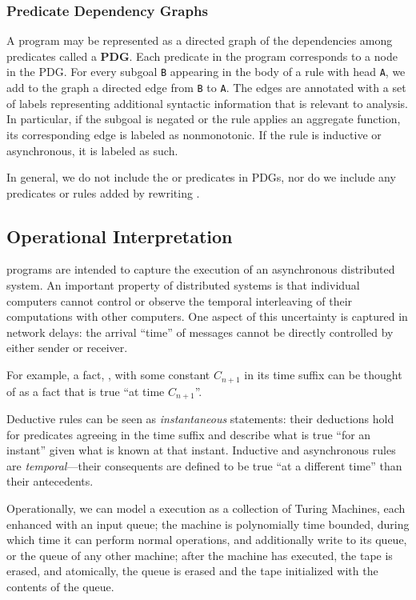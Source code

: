 \subsubsection{Predicate Dependency Graphs}

A \lang program may be represented as a directed graph of the dependencies
among predicates called a \textbf{PDG}.
Each predicate in the program corresponds to a node in the PDG.
For every subgoal \texttt{B} appearing in the body of a rule with head \texttt{A},
we add to the graph a directed edge from \texttt{B} to \texttt{A}.  The edges are annotated
with a set of labels representing additional syntactic information that is relevant to 
analysis.  In particular, if the subgoal is negated or the rule applies an aggregate function,
its corresponding edge is labeled as nonmonotonic.  If the rule is inductive or asynchronous,
it is labeled as such.

In general, we do not include the  or  predicates in PDGs,
nor do we include any predicates or rules added by rewriting .

\subsection{Operational Interpretation}

\lang programs are intended to capture the execution of an asynchronous distributed system.  An important property of distributed systems is that individual computers cannot control or observe the temporal interleaving of their computations with other computers.  One aspect of this uncertainty is captured in network delays: the arrival ``time'' of messages cannot be directly controlled by either sender or receiver.

For example, a fact, , with some constant $C_{n+1}$ in its time
suffix can be thought of as a fact that is true ``at time $C_{n+1}$''.

Deductive rules can be seen as {\em instantaneous} statements: their deductions hold for 
predicates agreeing in the time suffix and describe what is true ``for an instant'' given 
what is known at that instant.
 Inductive and asynchronous 
 rules are {\em temporal}---their consequents are defined to
be true ``at a different time'' than their antecedents.

Operationally, we can model a \lang execution as a collection of Turing Machines, each enhanced with an input queue; the machine is polynomially time bounded, during which time it can perform normal operations, and additionally write to its queue, or the queue of any other machine; after the machine has executed, the tape is erased, and atomically, the queue is erased and the tape initialized with the contents of the queue. 

